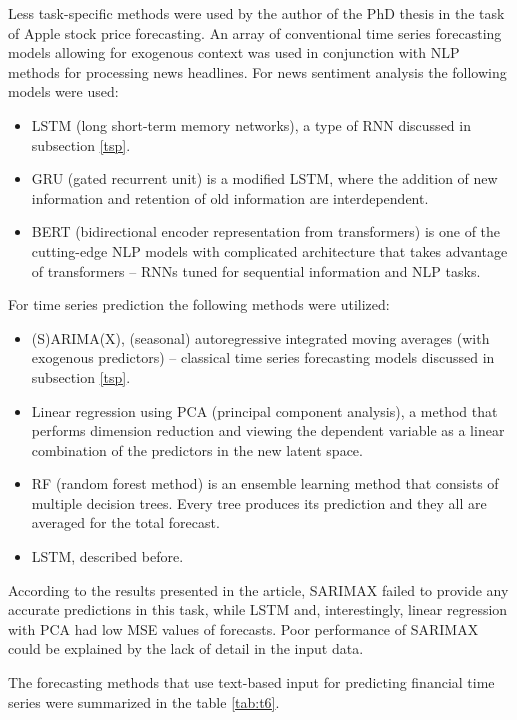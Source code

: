 \documentclass[3p,times,procedia]{elsarticle}
\begin{document}
Less task-specific methods were used by the author of the PhD thesis \cite{jeong2022predicting} in the task of Apple stock price forecasting. An array of conventional time series forecasting models allowing for exogenous context was used in conjunction with NLP methods for processing news headlines. For news sentiment analysis the following models were used:
\begin{itemize}
	\item LSTM (long short-term memory networks), a type of RNN discussed in subsection \ref{tsp}.
	\item GRU (gated recurrent unit) is a modified LSTM, where the addition of new information and retention of old information are interdependent.
	\item BERT (bidirectional encoder representation from transformers) is one of the cutting-edge NLP models with complicated architecture that takes advantage of transformers -- RNNs tuned for sequential information and NLP tasks.
\end{itemize}

For time series prediction the following methods were utilized:
\begin{itemize}
	\item (S)ARIMA(X), (seasonal) autoregressive integrated moving averages (with exogenous predictors) -- classical time series forecasting models discussed in subsection \ref{tsp}.
	\item Linear regression using PCA (principal component analysis), a method that performs dimension reduction and viewing the dependent variable as a linear combination of the predictors in the new latent space. 
	\item RF (random forest method) is an ensemble learning method that consists of multiple decision trees. Every tree produces its prediction and they all are averaged for the total forecast. 
	\item LSTM, described before.
\end{itemize}

According to the results presented in the article, SARIMAX failed to provide any accurate predictions in this task, while LSTM and, interestingly, linear regression with PCA had low MSE values of forecasts. Poor performance of SARIMAX could be explained by the lack of detail in the input data.

The forecasting methods that use text-based input for predicting financial time series were summarized in the table \ref{tab:t6}.
\end{document}
